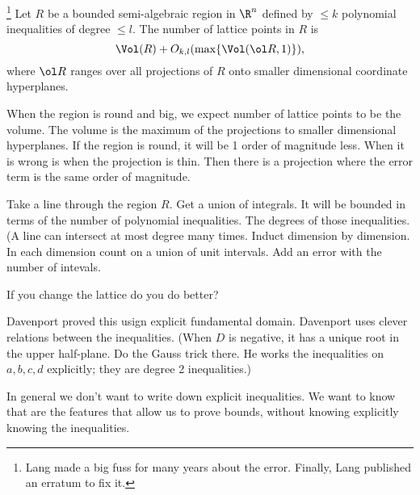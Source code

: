 \begin{thm}\footnote{Lang made a big fuss for many years about the error. Finally, Lang published an erratum to fix it.}\label{lem:davenport}
Let $R$ be a bounded semi-algebraic region in $\R^n$ defined by  $\le k$ polynomial inequalities of degree $\le l$. The number of lattice points in $R$ is
\[
\Vol (R) + O_{k,l}(\max\{\Vol(\ol R,1)\}),
\]
where $\ol R$ ranges over all projections of $R$ onto smaller dimensional coordinate hyperplanes.
\end{thm}

When the region is round and big, we expect number of lattice points to be the volume. The volume is the maximum of the projections to smaller dimensional hyperplanes. If the region is round, it will be 1 order of magnitude less. When it is wrong is when the projection is thin. Then there is a projection where the error term is the same order of magnitude.

Take a line through the region $R$. Get a union of integrals. It will be bounded in terms of the number of polynomial inequalities. The degrees of those inequalities. (A line can intersect at most degree many times. Induct dimension by dimension. In each dimension count on a union of unit intervals. Add an error with the number of intevals. %


If you change the lattice do you do better?

Davenport proved this usign explicit fundamental domain. Davenport uses clever relations between the inequalities.
(When $D$ is negative, it has a unique root in the upper half-plane. Do the Gauss trick there. He works the inequalities on $a,b,c,d$ explicitly; they are degree 2 inequalities.)

In general we don't want to write down explicit inequalities. We want to know that are the features that allow us to prove bounds, without  knowing explicitly knowing the inequalities. 

